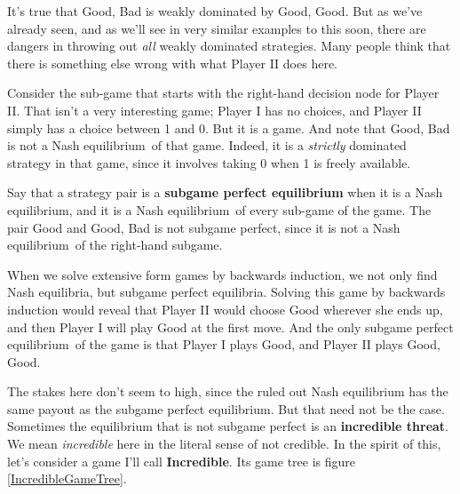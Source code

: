 \documentclass[openany]{book}
\newcommand{\eqm}{equilibrium}
\begin{document}
It's true that Good, Bad is weakly dominated by Good, Good. But as we've already seen, and as we'll see in very similar examples to this soon, there are dangers in throwing out \textit{all} weakly dominated strategies. Many people think that there is something else wrong with what Player II does here.

Consider the sub-game that starts with the right-hand decision node for Play\-er II. That isn't a very interesting game; Player I has no choices, and Player II simply has a choice between 1 and 0. But it is a game. And note that Good, Bad is not a Nash \eqm\ of that game. Indeed, it is a \textit{strictly} dominated strategy in that game, since it involves taking 0 when 1 is freely available.

Say that a strategy pair is a \textbf{subgame perfect \eqm} when it is a Nash \eqm, and it is a Nash \eqm\ of every sub-game of the game. The pair Good and Good, Bad is not subgame perfect, since it is not a Nash \eqm\ of the right-hand subgame.

When we solve extensive form games by backwards induction, we not only find Nash equilibria, but subgame perfect equilibria. Solving this game by backwards induction would reveal that Player II would choose Good wherever she ends up, and then Player I will play Good at the first move. And the only subgame perfect \eqm\ of the game is that Player I plays Good, and Player II plays Good, Good.

The stakes here don't seem to high, since the ruled out Nash equilibrium has the same payout as the subgame perfect equilibrium. But that need not be the case. Sometimes the equilibrium that is not subgame perfect is an \textbf{incredible threat}. We mean \textit{incredible} here in the literal sense of not credible. In the spirit of this, let's consider a game I'll call \textbf{Incredible}. Its game tree is figure \ref{IncredibleGameTree}.
\end{document}
